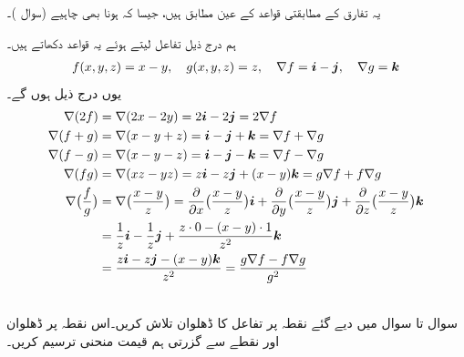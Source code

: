 یہ  تفارق کے  مطابقتی قواعد  کے عین مطابق ہیں، جیسا کہ ہونا بھی چاہیے (سوال )۔

ہم  درج ذیل تفاعل لیتے ہوئے   یہ  قواعد   دکھاتے ہیں۔
\begin{align*}
f(x,y,z)=x-y,\quad g(x,y,z)=z,\quad \nabla f={\boldsymbol{i}}-{\boldsymbol{j}},\quad \nabla g={\boldsymbol{k}}
\end{align*}
یوں درج ذیل ہوں گے۔
\begin{align*}
\nabla(2f)&=\nabla(2x-2y)=2{\boldsymbol{i}}-2{\boldsymbol{j}}=2\nabla f\\
\nabla(f+g)&=\nabla(x-y+z)={\boldsymbol{i}}-{\boldsymbol{j}}+{\boldsymbol{k}}=\nabla f+\nabla g \\
\nabla(f-g)&=\nabla(x-y-z)={\boldsymbol{i}}-{\boldsymbol{j}}-{\boldsymbol{k}}=\nabla f-\nabla g\\
\nabla (fg)&=\nabla(xz-yz)=z{\boldsymbol{i}}-z{\boldsymbol{j}}+(x-y){\boldsymbol{k}}=g\nabla f+f\nabla g\\
\nabla\big(\frac{f}{g}\big)&=\nabla\big(\frac{x-y}{z}\big)=\frac{\partial}{\partial x}\big(\frac{x-y}{z}\big){\boldsymbol{i}}+\frac{\partial}{\partial y}\big(\frac{x-y}{z}\big){\boldsymbol{j}}+\frac{\partial}{\partial z}\big(\frac{x-y}{z}\big){\boldsymbol{k}}\\
&=\frac{1}{z}{\boldsymbol{i}}-\frac{1}{z}{\boldsymbol{j}}+\frac{z\cdot 0-(x-y)\cdot 1}{z^2}{\boldsymbol{k}}\\
&=\frac{z{\boldsymbol{i}}-z{\boldsymbol{j}}-(x-y){\boldsymbol{k}}}{z^2}=\frac{g\nabla f-f\nabla g}{g^2}
\end{align*}


\\
سوال  تا سوال  میں دیے  گئے نقطہ   پر تفاعل کا ڈھلوان  تلاش کریں۔اس  نقطہ پر ڈھلوان اور  نقطے سے گزرتی   ہم قیمت منحنی  ترسیم کریں۔

